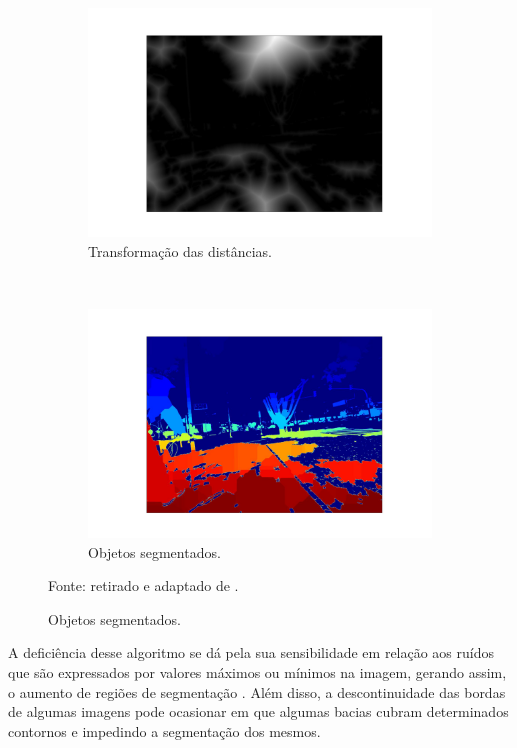 \begin{figure}[H]
    \begin{subfigure}[t]{0.45\textwidth}
        \centering
        \includegraphics[width=1\linewidth]{recursos/imagens/image_seg/watershed2.jpg}
        \caption{Transformação das distâncias.}
        \label{segment:fig:watershed_2.3}
    \end{subfigure}
    ~
    \begin{subfigure}[t]{0.45\textwidth}
        \centering
        \includegraphics[width=1\linewidth]{recursos/imagens/image_seg/watershed3.jpg}
        \caption{Objetos segmentados.}
        \label{segment:fig:watershed_2.4}
    \end{subfigure}

    Fonte: retirado e adaptado de \cite{Neuhold2017_ICCV}.
\end{figure}


A deficiência desse algoritmo se dá pela sua sensibilidade em relação aos ruídos que são expressados por valores máximos ou mínimos na imagem, gerando assim, o aumento de regiões de segmentação \citep{pedrini2008analise}. Além disso, a descontinuidade das bordas de algumas imagens pode ocasionar em que algumas bacias cubram determinados contornos e impedindo a segmentação dos mesmos.

